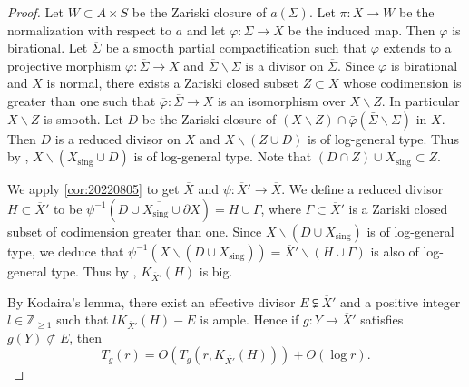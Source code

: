 \documentclass[11pt,english]{smfart}
\theoremstyle{plain}
\theoremstyle{definition}
\theoremstyle{remark}
\numberwithin{equation}{section}
\theoremstyle{plain}
\begin{document}
	
	\begin{proof}
		Let $W\subset A\times S$ be the Zariski closure of $a(\Sigma)$.
		Let $\pi :X\to W$ be the normalization with respect to $a$
		and let $\varphi :\Sigma\to X$ be the induced map.
		Then $\varphi$ is birational.
		Let $\overline{\Sigma}$ be a smooth partial compactification such that $\varphi$
		extends to a projective morphism $\overline{\varphi}:\overline{\Sigma}\to X$ and
		$\overline{\Sigma}\backslash \Sigma$ is a divisor on $\overline{\Sigma}$. 
		Since $\overline{\varphi}$ is birational and $X$ is normal, there exists a
		Zariski closed subset $Z\subset X$ whose codimension is greater than one
		such that $\overline{\varphi}:\overline{\Sigma}\to X$ is an isomorphism over $X\backslash Z$.
		In particular $X\backslash Z$ is smooth.
		Let $D$ be the Zariski closure of
		$(X\backslash Z)\cap \bar{\varphi}(\bar{\Sigma}\backslash \Sigma)$ in $X$.
		Then $D$ is a reduced divisor on $X$ and $X\backslash (Z\cup D)$
		is of log-general type.
		Thus by \cite[Lemma 4]{NWY13}, $X\backslash (X_{\mathrm{sing}}\cup D)$
		is of log-general type.
		Note that $(D\cap Z)\cup X_{\mathrm{sing}}\subset Z$.
		
		
		We apply \cref{cor:20220805} to get $\overline{X}$ and $\psi:\overline{X}'\to \overline{X}$.
		We define a reduced divisor $H\subset \overline{X}'$ to be 	
		$\psi^{-1}(\overline{D\cup X_{\mathrm{sing}}\cup \partial X})=H\cup \Gamma$, where $\Gamma\subset \overline{X}'$ is a Zariski closed subset of codimension greater than one.	
		Since $X\backslash (D\cup X_{\mathrm{sing}})$ is of log-general type, we deduce that $\psi ^{-1}(X\backslash (D\cup
		X_{\mathrm{sing}}))=\overline{X}'\backslash (H\cup \Gamma)$ is also of log-general type.
		Thus by \cite[Lemma 3]{NWY13}, $K_{\overline{X}'}(H)$ is big.
		
		By Kodaira's lemma, there exist an effective divisor $E\subsetneqq \overline{X}'$ and a positive integer $l\in\mathbb Z_{\geq 1}$ such that $lK_{\overline{X}'}(H)-E$ is ample.	
		Hence if $g:Y\to \overline{X}'$ satisfies $g(Y)\not\subset E$, then 
		$$T_{g}(r)= O( T_{g}(r,K_{\overline{X'}}(H)))+O(\log r).$$ 	
		
		
		

\end{proof}
\end{document}
